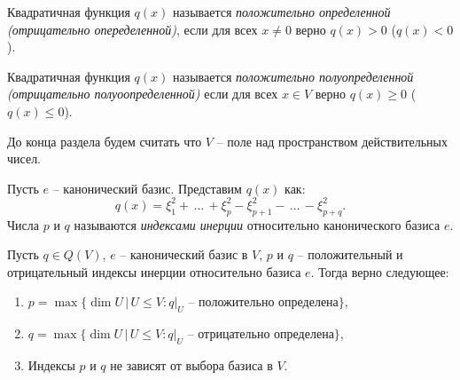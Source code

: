 \begin{definition}
    Квадратичная функция $q(x)$ называется \textit{положительно определенной (отрицательно опеределенной)}, 
    если для всех $x \neq 0$ верно $q(x) > 0$ ($q(x) < 0$).
\end{definition}

\begin{definition}
    Квадратичная функция $q(x)$ называется \textit{положительно полуопределенной (отрицательно полуоопределенной)} 
    если для всех $x \in V$ верно $q(x) \geq 0$ ($q(x) \leq 0$).
\end{definition}

\begin{agreement}
    До конца раздела будем считать что $V$ -- поле над пространством действительных чисел.
\end{agreement}

\begin{definition}
    Пусть $e$ -- канонический базис. Представим $q(x)$ как: 
    $$q(x) = \xi_1^2 + \, \dots \,+ \xi_p^2 - \xi^2_{p+1} - \, \dots \,- \xi^2_{p+q}.$$ 
    Числа $p$ и $q$ называются \textit{индексами инерции} относительно канонического базиса $e$.
\end{definition}

\begin{theorem}
    Пусть $q \in Q(V)$, $e$ -- канонический базис в $V$, $p$ и $q$ -- положительный и отрицательный 
    индексы инерции относительно базиса $e$. Тогда верно следующее: 
    \begin{enumerate}
        \item $p = \max\{\dim U \, \vert \, U \leq V : q \vert_{U} \text{ -- положительно определена}\}$,
        \item $q = \max\{\dim U \, \vert \, U \leq V : q \vert_{U} \text{ -- отрицательно определена}\}$,
        \item Индексы $p$ и $q$ не зависят от выбора базиса в $V$.
    \end{enumerate}
\end{theorem}

